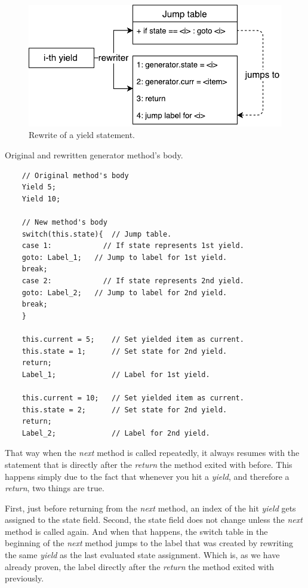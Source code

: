 \begin{figure}[h]
	\centering	
	\includegraphics[scale=0.75]{../img/4_1_position}	
	\caption{Rewrite of a yield statement.}
	\label{fig4.1:Position}
\end{figure}

\begin{listing}[H]
	\caption{Original and rewritten generator method's body.}
	\label{list4.1:generatorRewrite}
	\begin{verbatim}
	// Original method's body
	Yield 5;
	Yield 10;
	
	// New method's body
	switch(this.state){  // Jump table.
	case 1:            // If state represents 1st yield.
	goto: Label_1;   // Jump to label for 1st yield.
	break;
	case 2:            // If state represents 2nd yield.
	goto: Label_2;   // Jump to label for 2nd yield.
	break;
	}
	
	this.current = 5;    // Set yielded item as current.
	this.state = 1;      // Set state for 2nd yield.
	return;
	Label_1;             // Label for 1st yield.
	
	this.current = 10;   // Set yielded item as current.
	this.state = 2;      // Set state for 2nd yield.
	return;
	Label_2;             // Label for 2nd yield.
	\end{verbatim}
\end{listing}

That way when the \emph{next} method is called repeatedly, it always resumes with the statement that is directly after the \emph{return} the method exited with before. This happens simply due to the fact that whenever you hit a \emph{yield}, and therefore a \emph{return}, two things are true. 

First, just before returning from the \emph{next} method, an index of the hit \emph{yield} gets assigned to the state field. Second, the state field does not change unless the \emph{next} method is called again. And when that happens, the switch table in the beginning of the \emph{next} method jumps to the label that was created by rewriting the same \emph{yield} as the last evaluated state assignment. Which is, as we have already proven, the label directly after the \emph{return} the method exited with previously.

